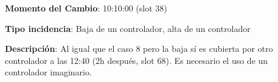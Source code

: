 \textbf{Momento del Cambio}: 10:10:00 (slot 38)

\textbf{Tipo incidencia}: Baja de un controlador, alta de un controlador

\textbf{Descripción}: Al igual que el caso 8 pero la baja sí es cubierta por otro controlador a las 12:40 (2h después, slot 68). Es necesario el uso de un controlador imaginario.


